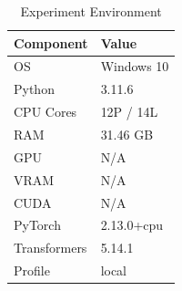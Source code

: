 \begin{table}[htbp]
\caption{Experiment Environment}
\label{tab:environment}
\centering
\begin{tabular}{ll}
\toprule
\textbf{Component} & \textbf{Value} \\
\midrule
  OS & Windows 10 \\
  Python & 3.11.6 \\
  CPU Cores & 12P / 14L \\
  RAM & 31.46 GB \\
  GPU & N/A \\
  VRAM & N/A \\
  CUDA & N/A \\
  PyTorch & 2.13.0+cpu \\
  Transformers & 5.14.1 \\
  Profile & local \\
\bottomrule
\end{tabular}
\end{table}